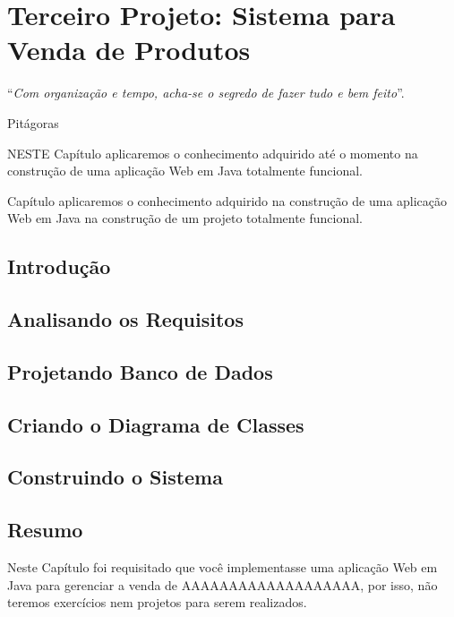 \chapter{Terceiro Projeto: Sistema para Venda de Produtos}\label{cap:quartoProjeto}
\epigraph{``\textit{Com organização e tempo, acha-se o segredo de fazer tudo e bem feito}''.}{Pitágoras}

\lettrine[lines=4, lhang=0.1, lraise=0, loversize=0.2, findent=0.1em]{\textcolor{corAzulTema}{N}}{ESTE} Capítulo aplicaremos o conhecimento adquirido até o momento na construção de uma aplicação Web em Java totalmente funcional.


Capítulo aplicaremos o conhecimento adquirido na construção de uma aplicação Web em Java na construção de um projeto totalmente funcional.

\section{Introdução}

\section{Analisando os Requisitos}

\section{Projetando Banco de Dados}

\section{Criando o Diagrama de Classes}

\section{Construindo o Sistema}

\section{Resumo}

Neste Capítulo foi requisitado que você implementasse uma aplicação Web em Java para gerenciar a venda de AAAAAAAAAAAAAAAAAAA, por isso, não teremos exercícios nem projetos para serem realizados. 
